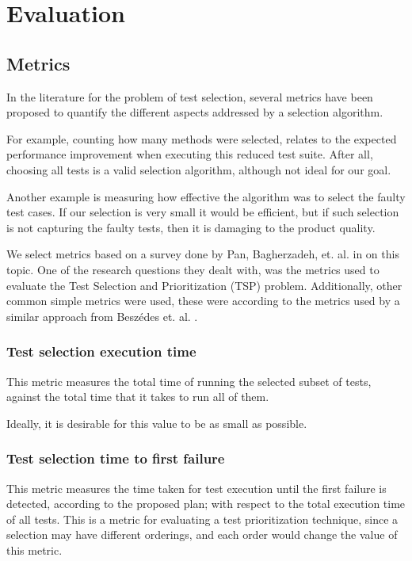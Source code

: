 \documentclass{article}
\begin{document}
\section{Evaluation}\label{section:evaluation}
\subsection{Metrics}\label{section:metrics}
In the literature for the problem of test selection, several metrics have been proposed to quantify the different aspects addressed by a selection algorithm.

For example, counting how many methods were selected, relates to the expected performance improvement when executing this reduced test suite. After all, choosing all tests is a valid selection algorithm, although not ideal for our goal.

Another example is measuring how effective the algorithm was to select the faulty test cases. If our selection is very small it would be efficient, but if such selection is not capturing the faulty tests, then it is damaging to the product quality.

We select metrics based on a survey done by Pan, Bagherzadeh, et. al. in \cite{Pan2021TestCS} on this topic. One of the research questions they dealt with, was the metrics used to evaluate the Test Selection and Prioritization (TSP) problem. Additionally, other common simple metrics were used, these were according to the metrics used by a similar approach from Beszédes et. al. \cite{6405252}.

\subsubsection{Test selection execution time}
This metric measures the total time of running the selected subset of tests, against the total time that it takes to run all of them.

Ideally, it is desirable for this value to be as small as possible.
\subsubsection{Test selection time to first failure}\label{section:tffailure}
This metric measures the time taken for test execution until the first failure is detected, according to the proposed plan; with respect to the total execution time of all tests. This is a metric for evaluating a test prioritization technique, since a selection may have different orderings, and each order would change the value of this metric.
\end{document}
